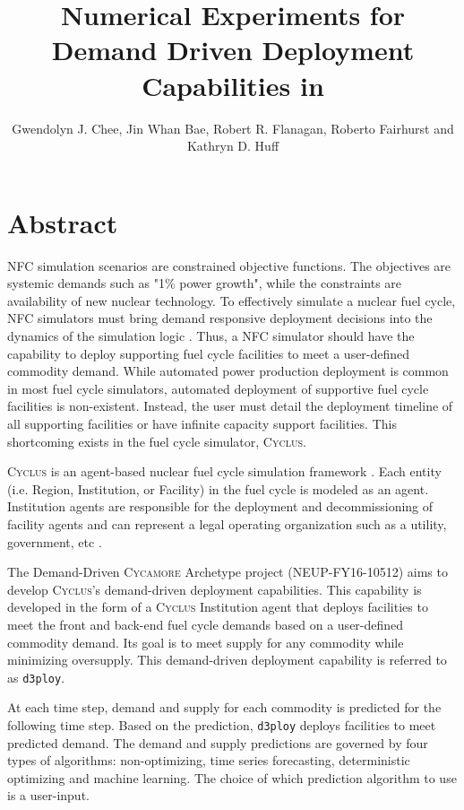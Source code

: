\documentclass{anstrans}
\title{Numerical Experiments for Demand Driven Deployment Capabilities in \Cyclus}
\author{Gwendolyn J. Chee, Jin Whan Bae, Robert R. Flanagan, Roberto Fairhurst and Kathryn D. Huff}
\institute{
Dept. of Nuclear, Plasma and Radiological Engineering, University of Illinois at Urbana-Champaign \\
gchee2@illinois.edu
}
\newcommand{\Cyclus}{\textsc{Cyclus}\xspace}%
\newcommand{\Cycamore}{\textsc{Cycamore}\xspace}%
\begin{document}
\section{Abstract}
\gls{NFC} simulation scenarios are constrained objective functions. 
The objectives are systemic demands such as "1\% power growth", while the 
constraints are availability of new nuclear technology. 
To effectively simulate a nuclear fuel cycle, \gls{NFC} simulators 
must bring demand responsive deployment decisions into the dynamics of the 
simulation logic \cite{huff_current_2017}. 
Thus, a \gls{NFC} simulator should have the capability to deploy 
supporting fuel cycle facilities to meet a user-defined commodity demand. 
While automated power production deployment is common in most fuel cycle simulators, automated deployment of supportive fuel cycle 
facilities is non-existent. 
Instead, the user must detail the deployment timeline of all supporting 
facilities or have infinite capacity support facilities. This shortcoming 
exists in the fuel cycle simulator, \Cyclus. 

\Cyclus is an agent-based nuclear fuel cycle simulation framework 
\cite{huff_fundamental_2016}. 
Each entity (i.e. Region, Institution, or Facility) in the fuel cycle is modeled 
as an agent. 
Institution agents
are responsible for the deployment and decommissioning of facility agents and
can represent a legal operating organization such as a 
utility, government, etc \cite{huff_fundamental_2016}. 

The Demand-Driven \Cycamore Archetype project (NEUP-FY16-10512) aims to 
develop \Cyclus's demand-driven deployment capabilities. 
This capability is developed in the form of a \Cyclus Institution agent that 
deploys facilities to meet the front and back-end fuel cycle demands
based on a user-defined commodity demand. 
Its goal is to meet supply for any commodity while minimizing oversupply.
This demand-driven deployment capability is referred to as \texttt{d3ploy}. 

At each time step, demand and supply for each commodity is predicted for the 
following time step. Based on the prediction, \texttt{d3ploy} deploys facilities to 
meet predicted demand. 
The demand and supply predictions are governed by four types of algorithms: 
non-optimizing, time series forecasting, deterministic optimizing and machine 
learning. 
The choice of which prediction algorithm to use is a user-input. 
\end{document}
